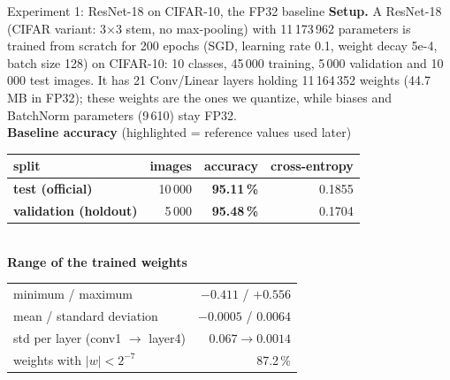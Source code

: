 \documentclass[aspectratio=169,10pt]{beamer}
\newcommand{\hlrow}{\rowcolor{hl}}
\begin{document}
\begin{frame}{Experiment 1: ResNet-18 on CIFAR-10, the FP32 baseline}
  \small
  \textbf{Setup.} A ResNet-18 (CIFAR variant: 3$\times$3 stem, no max-pooling) with 11\,173\,962 parameters is trained from scratch for 200 epochs
  (SGD, learning rate 0.1, weight decay 5e-4, batch size 128) on CIFAR-10: 10 classes, 45\,000 training, 5\,000 validation and 10\,000 test images.
  It has 21 Conv/Linear layers holding 11\,164\,352 weights (44.7 MB in FP32); these weights are the ones we quantize,
  while biases and BatchNorm parameters (9\,610) stay FP32.\\[5mm]
  \centering
  \textbf{Baseline accuracy} (highlighted = reference values used later)\\[2mm]
  \begin{tabular}{lrrr}
    \toprule
    split & images & accuracy & cross-entropy\\
    \midrule
    \hlrow \textbf{test (official)} & 10\,000 & \textbf{95.11\,\%} & 0.1855\\
    \hlrow \textbf{validation (holdout)} & 5\,000 & \textbf{95.48\,\%} & 0.1704\\
    \bottomrule
  \end{tabular}\\[6mm]
  \textbf{Range of the trained weights}\\[2mm]
  \begin{tabular}{lr}
    \toprule
    minimum / maximum & $-0.411$ / $+0.556$\\
    mean / standard deviation & $-0.0005$ / $0.0064$\\
    std per layer (conv1 $\to$ layer4) & $0.067 \to 0.0014$\\
    weights with $|w|<2^{-7}$ & 87.2\,\%\\
    \bottomrule
  \end{tabular}
\end{frame}
\end{document}

